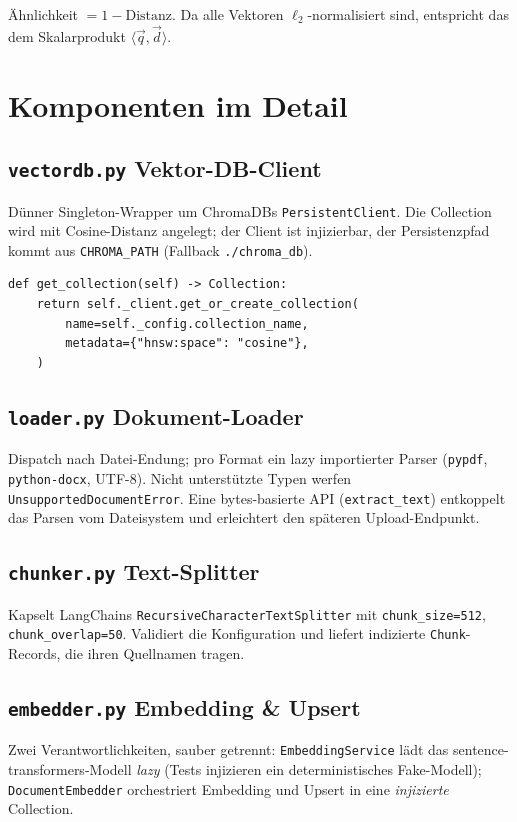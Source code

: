 \documentclass[11pt,a4paper]{article}
\begin{document}
\noindent Ähnlichkeit $= 1 - \text{Distanz}$. Da alle Vektoren $\ell_2$-normalisiert sind,
entspricht das dem Skalarprodukt $\langle \vec{q}, \vec{d}\rangle$.

\section{Komponenten im Detail}

\subsection{\texttt{vectordb.py} \textendash{} Vektor-DB-Client}
Dünner Singleton-Wrapper um ChromaDBs \texttt{PersistentClient}. Die Collection wird
mit Cosine-Distanz angelegt; der Client ist injizierbar, der Persistenzpfad kommt aus
\texttt{CHROMA\_PATH} (Fallback \texttt{./chroma\_db}).

\begin{lstlisting}[style=py]
def get_collection(self) -> Collection:
    return self._client.get_or_create_collection(
        name=self._config.collection_name,
        metadata={"hnsw:space": "cosine"},
    )
\end{lstlisting}

\subsection{\texttt{loader.py} \textendash{} Dokument-Loader}
Dispatch nach Datei-Endung; pro Format ein lazy importierter Parser
(\texttt{pypdf}, \texttt{python-docx}, UTF-8). Nicht unterstützte Typen werfen
\texttt{UnsupportedDocumentError}. Eine bytes-basierte API (\texttt{extract\_text})
entkoppelt das Parsen vom Dateisystem und erleichtert den späteren Upload-Endpunkt.

\subsection{\texttt{chunker.py} \textendash{} Text-Splitter}
Kapselt LangChains \texttt{RecursiveCharacterTextSplitter} mit
\texttt{chunk\_size=512}, \texttt{chunk\_overlap=50}. Validiert die Konfiguration und
liefert indizierte \texttt{Chunk}-Records, die ihren Quellnamen tragen.

\subsection{\texttt{embedder.py} \textendash{} Embedding \& Upsert}
Zwei Verantwortlichkeiten, sauber getrennt: \texttt{EmbeddingService} lädt das
sentence-transformers-Modell \emph{lazy} (Tests injizieren ein deterministisches
Fake-Modell); \texttt{DocumentEmbedder} orchestriert Embedding und Upsert in eine
\emph{injizierte} Collection.
\end{document}
